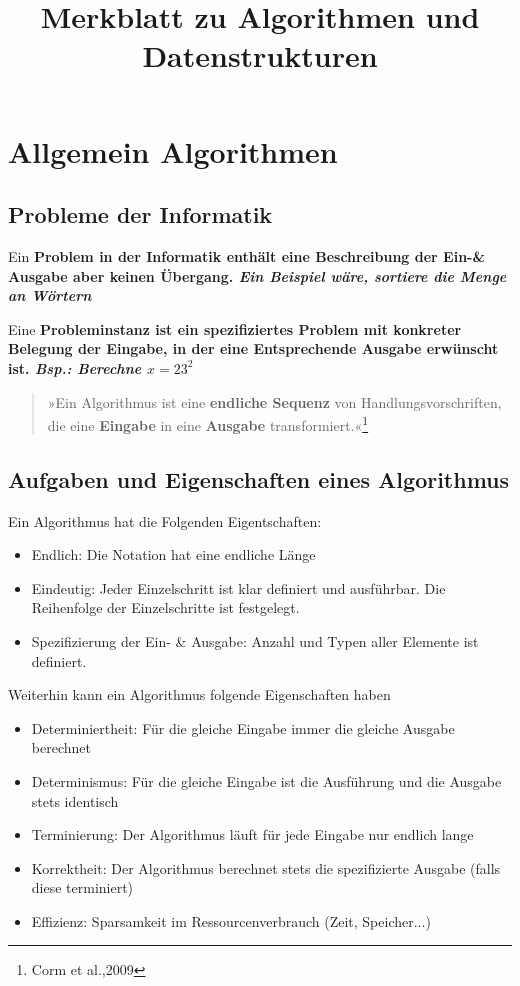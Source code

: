 \documentclass[jou,apacite]{apa6}
\title{Merkblatt zu Algorithmen und Datenstrukturen}
\begin{document}
\maketitle    
\tableofcontents 

\section{Allgemein Algorithmen}

\subsection{Probleme der Informatik}
Ein \bfseries Problem \normalfont in der Informatik enthält eine Beschreibung der Ein-\& Ausgabe aber keinen Übergang. \itshape Ein Beispiel wäre, sortiere die Menge an Wörtern \normalfont

Eine \bfseries Probleminstanz \normalfont ist ein spezifiziertes Problem mit konkreter Belegung der Eingabe, in der eine Entsprechende Ausgabe erwünscht ist. {\itshape Bsp.: Berechne $x=23^2$}

\begin{quote}
    »Ein Algorithmus ist eine {\bfseries endliche Sequenz} von Handlungsvorschriften, die eine {\bfseries Eingabe} in eine {\bfseries Ausgabe} transformiert.«\footnote{Corm et al.,2009}
\end{quote}

\subsection{Aufgaben und Eigenschaften eines Algorithmus}
Ein Algorithmus hat die Folgenden Eigentschaften:
\begin{itemize}
\item Endlich: Die Notation hat eine endliche Länge
\item Eindeutig: Jeder Einzelschritt ist klar definiert und ausführbar. Die Reihenfolge der Einzelschritte ist festgelegt. 
\item Spezifizierung der Ein- \& Ausgabe: Anzahl und Typen aller Elemente ist definiert.
\end{itemize}
Weiterhin kann ein Algorithmus folgende Eigenschaften haben 
\begin{itemize}
\item Determiniertheit: Für die gleiche Eingabe immer die gleiche Ausgabe berechnet
\item Determinismus: Für die gleiche Eingabe ist die Ausführung und die Ausgabe stets identisch
\item Terminierung: Der Algorithmus läuft für jede Eingabe nur endlich lange
\item Korrektheit: Der Algorithmus berechnet stets die spezifizierte Ausgabe (falls diese terminiert)
\item Effizienz: Sparsamkeit im Ressourcenverbrauch (Zeit, Speicher...)
\end{itemize}
\end{document}
